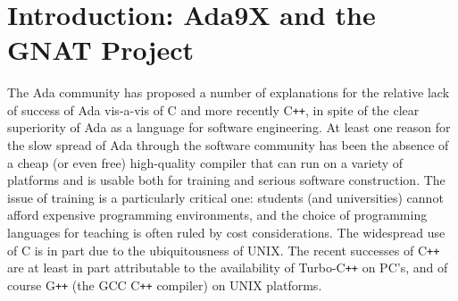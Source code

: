 %

\maketitle
\setlength{\baselineskip}{16pt}

\pagestyle{plain}

\mbox{\ }
\vskip 1cm

\begin{center}
%
\end{center} 

\mbox{\ }
\vskip 3cm


\pagebreak

\mbox{\ }
\vskip 3cm

\fbox{
\begin{minipage}{6in}
\tableofcontents
\end{minipage}}

\pagebreak



\section{Introduction: Ada9X and the GNAT Project}

The Ada community has proposed a number of explanations for
the relative lack of success of Ada vis-a-vis of C and more recently
C{\tt ++}, in spite of the clear superiority of Ada as a language for 
software engineering. At least one
reason for the slow spread of Ada through the software community has been
the absence of a cheap (or even free) high-quality compiler that can run
on a variety of platforms and is usable both for training and serious
software construction.  The issue of training is a particularly critical one:
students (and universities) cannot afford expensive programming environments,
and the choice of programming languages for teaching is often ruled by cost
considerations. The widespread use of C is in part due to the ubiquitousness
of UNIX. The recent successes of C{\tt ++} are at least in part
attributable to the availability of Turbo-C{\tt ++} on PC's,
and of course G{\tt ++} (the GCC C{\tt ++} compiler) on  UNIX platforms.

